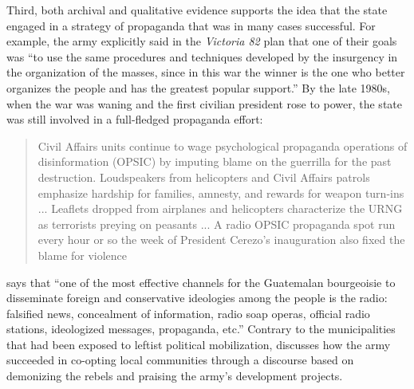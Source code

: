 \documentclass[12pt, notitlepage]{article}
\begin{document}
%


Third, both archival and qualitative evidence supports the idea that the state engaged in a strategy of propaganda that was in many cases successful.
For example, the army explicitly said in the \textit{Victoria 82} plan that one of their goals was ``to use the same procedures and techniques developed by the insurgency in the organization of the masses, since in this war the winner is the one who better organizes the people and has the greatest popular support.'' \citep[quoted in][II, 191]{CEH:1999aa}
By the late 1980s, when the war was waning and the first civilian president rose to power, the state was still involved in a full-fledged propaganda effort:

\begin{quote}
  Civil Affairs units continue to wage psychological propaganda operations of disinformation (OPSIC) by imputing blame on the guerrilla for the past destruction. Loudspeakers from helicopters and Civil Affairs patrols emphasize hardship for families, amnesty, and rewards for weapon turn-ins ... Leaflets dropped from airplanes and helicopters characterize the URNG as terrorists preying on peasants ... A radio OPSIC propaganda spot run every hour or so the week of President Cerezo's inauguration also fixed the blame for violence \citep[111]{Schirmer:1998wa}
\end{quote}

\citet[16]{Bran:1985tc} says that ``one of the most effective channels for the Guatemalan bourgeoisie to disseminate foreign and conservative ideologies among the people is the radio: falsified news, concealment of information, radio soap operas, official radio stations, ideologized messages, propaganda, etc.''
Contrary to the municipalities that had been exposed to leftist political mobilization, \citet{Esparza:2018uw} discusses how the army succeeded in co-opting local communities through a discourse based on demonizing the rebels and praising the army's development projects.
\end{document}
